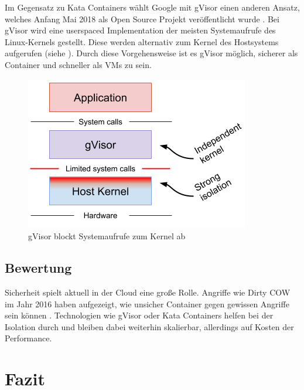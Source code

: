 Im Gegensatz zu Kata Containers wählt Google mit gVisor einen anderen Ansatz, welches Anfang Mai 2018 als Open Source Projekt veröffentlicht wurde \citep{OpenSourcingGVisoraSandboxedContainerRuntime}. Bei gVisor wird eine userspaced Implementation der meisten Systemaufrufe des Linux-Kernels gestellt. Diese werden alternativ zum Kernel des Hostsystems aufgerufen (siehe ). Durch diese Vorgehensweise ist es gVisor möglich, sicherer als Container und schneller als VMs zu sein.

\begin{figure}[h]
	\begin{center}
		\includegraphics[scale=0.7]{bilder/gVisor.png}
		\caption{gVisor blockt Systemaufrufe zum Kernel ab \citep{OpenSourcingGVisoraSandboxedContainerRuntime}}
		\label{fig:gVisor}		
	\end{center}
\end{figure}

\pagebreak
\subsection{Bewertung}
\label{sec:compVMbasedBewertung}
Sicherheit spielt aktuell in der Cloud eine große Rolle. Angriffe wie Dirty COW im Jahr 2016 haben aufgezeigt, wie unsicher Container gegen gewissen Angriffe sein können \citep{DirtyCOWCVE20165195}. Technologien wie gVisor oder Kata Containers helfen bei der Isolation durch und bleiben dabei weiterhin skalierbar, allerdings auf Kosten der Performance.

\section{Fazit}
\label{sec:compFazit}

